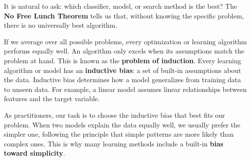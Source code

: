 It is natural to ask: which classifier, model, or search method is the best?
The \textbf{No Free Lunch Theorem} tells us that, without knowing the specific problem, there is no universally best algorithm.

If we average over all possible problems, every optimization or learning algorithm performs equally well.
An algorithm only excels when its assumptions match the problem at hand.
This is known as the \textbf{problem of induction}.
Every learning algorithm or model has an \textbf{inductive bias}: a set of built-in assumptions about the data.
Inductive bias determines how a model generalizes from training data to unseen data.
For example, a linear model assumes linear relationships between features and the target variable.

As practitioners, our task is to choose the inductive bias that best fits our problem.
When two models explain the data equally well, we usually prefer the simpler one, following the principle that simple patterns are more likely than complex ones.
This is why many learning methods include a built-in \textbf{bias toward simplicity}.